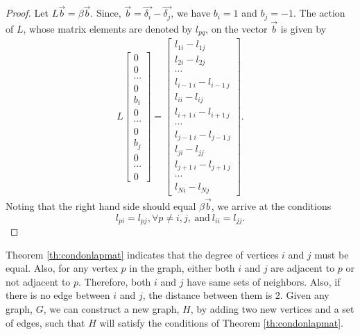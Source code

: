 \documentclass[%
 reprint,
 superscriptaddress,
 amsmath,amssymb,
 aps,
 pra,
floatfix,
nofootinbib,
]{revtex4-2}
\theoremstyle{definition}
\theoremstyle{remark}
\begin{document}
\begin{appendix}
\begin{proof}
Let $L\vec{b}=\beta\vec{b}$. Since, $\vec{b}=\vec{\delta_i}-\vec{\delta_j}$, we have $b_i=1$ and $b_j=-1$. The action of $L$, whose matrix elements are denoted by $l_{pq}$, on the vector $\vec{b}$ is given by 
\begin{eqnarray}
L \begin{bmatrix} 0 \\  0 \\ \cdots \\ 0 \\ b_i \\ 0 \\ \cdots \\  0 \\ b_j \\ 0 \\ \cdots \\ 0 \end{bmatrix} = \begin{bmatrix} l_{1i}-l_{1j} \\  l_{2i}-l_{2j} \\ \cdots \\ l_{i-1\ i}-l_{i-1\ j} \\ l_{ii}-l_{ij} \\ l_{i+1\ i}-l_{i+1\ j} \\ \cdots \\  l_{j-1\ i}-l_{j-1\ j} \\ l_{ji}-l_{jj} \\ l_{j+1\ i}-l_{j+1\ j} \\ \cdots \\ l_{Ni}-l_{Nj} \end{bmatrix}. 
\end{eqnarray}
Noting that the right hand side should equal $\beta\vec{b}$, we arrive at the conditions 
\begin{equation}
\boxed{l_{pi}=l_{pj}, \forall p \neq i, j, \ \mathrm{and} \ l_{ii}=l_{jj}. } 
\end{equation}

\end{proof} 

Theorem \ref{th:condonlapmat} indicates that the degree of vertices $i$ and $j$ must be equal. Also, for any vertex $p$ in the graph, either both $i$ and $j$ are adjacent to $p$ or not adjacent to $p$. Therefore, both $i$ and $j$ have same sets of neighbors. Also, if there is no edge between $i$ and $j$, the distance between them is $2$. Given any graph, $G$, we can construct a new graph, $H$, by adding two new vertices and a set of edges, such that $H$ will satisfy the conditions of Theorem \ref{th:condonlapmat}. 


\end{appendix}
\end{document}
